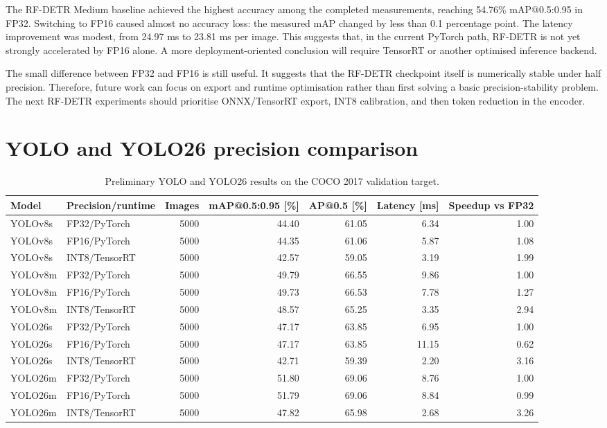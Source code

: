 \documentclass[a4paper,11pt,twoside]{report}
\theoremstyle{definition}
\begin{document}
The RF-DETR Medium baseline achieved the highest accuracy among the completed measurements, reaching 54.76\% mAP@0.5:0.95 in FP32. Switching to FP16 caused almost no accuracy loss: the measured mAP changed by less than 0.1 percentage point. The latency improvement was modest, from 24.97 ms to 23.81 ms per image. This suggests that, in the current PyTorch path, RF-DETR is not yet strongly accelerated by FP16 alone. A more deployment-oriented conclusion will require TensorRT or another optimised inference backend.

The small difference between FP32 and FP16 is still useful. It suggests that the RF-DETR checkpoint itself is numerically stable under half precision. Therefore, future work can focus on export and runtime optimisation rather than first solving a basic precision-stability problem. The next RF-DETR experiments should prioritise ONNX/TensorRT export, INT8 calibration, and then token reduction in the encoder.

\section{YOLO and YOLO26 precision comparison}

\begin{table}[H]
\centering
\scriptsize
\begin{tabular}{llrrrrr}
\hline
Model & Precision/runtime & Images & mAP@0.5:0.95 [\%] & AP@0.5 [\%] & Latency [ms] & Speedup vs FP32 \\
\hline
YOLOv8s & FP32/PyTorch & 5000 & 44.40 & 61.05 & 6.34 & 1.00 \\
YOLOv8s & FP16/PyTorch & 5000 & 44.35 & 61.06 & 5.87 & 1.08 \\
YOLOv8s & INT8/TensorRT & 5000 & 42.57 & 59.05 & 3.19 & 1.99 \\
\hline
YOLOv8m & FP32/PyTorch & 5000 & 49.79 & 66.55 & 9.86 & 1.00 \\
YOLOv8m & FP16/PyTorch & 5000 & 49.73 & 66.53 & 7.78 & 1.27 \\
YOLOv8m & INT8/TensorRT & 5000 & 48.57 & 65.25 & 3.35 & 2.94 \\
\hline
YOLO26s & FP32/PyTorch & 5000 & 47.17 & 63.85 & 6.95 & 1.00 \\
YOLO26s & FP16/PyTorch & 5000 & 47.17 & 63.85 & 11.15 & 0.62 \\
YOLO26s & INT8/TensorRT & 5000 & 42.71 & 59.39 & 2.20 & 3.16 \\
\hline
YOLO26m & FP32/PyTorch & 5000 & 51.80 & 69.06 & 8.76 & 1.00 \\
YOLO26m & FP16/PyTorch & 5000 & 51.79 & 69.06 & 8.84 & 0.99 \\
YOLO26m & INT8/TensorRT & 5000 & 47.82 & 65.98 & 2.68 & 3.26 \\
\hline
\end{tabular}
\caption{Preliminary YOLO and YOLO26 results on the COCO 2017 validation target.}
\label{tab:prelim_yolo_precision}
\end{table}
\end{document}
